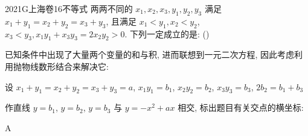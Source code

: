 
\begin{problem}{2021}{G}{上海卷}{16}{不等式}
两两不同的 $x_1,x_2,x_3,y_1,y_2,y_3$ 满足 $x_1+y_1=x_2+y_2=x_3+y_3$, 且满足 $x_1<y_1,x_2<y_2$, $x_3<y_3,x_1y_1+x_3y_3=2x_2y_2>0$. 下列一定成立的是: (\hspace{1cm})
\begin{choices}
\end{choices}

已知条件中出现了大量两个变量的和与积, 进而联想到一元二次方程, 因此考虑利用抛物线数形结合来解决它:

设 $x_1+y_1=x_2+y_2=x_3+y_3=a$, $x_1y_1=b_1$, $x_2y_2=b_2$, $x_3y_3=b_3$, $2b_2=b_1+b_3$

作直线 $y=b_1$, $y=b_2$, $y=b_3$ 与 $y=-x^2+ax$ 相交, 标出题目有关交点的横坐标:
\end{problem}

\begin{answer}
A
\end{answer}

